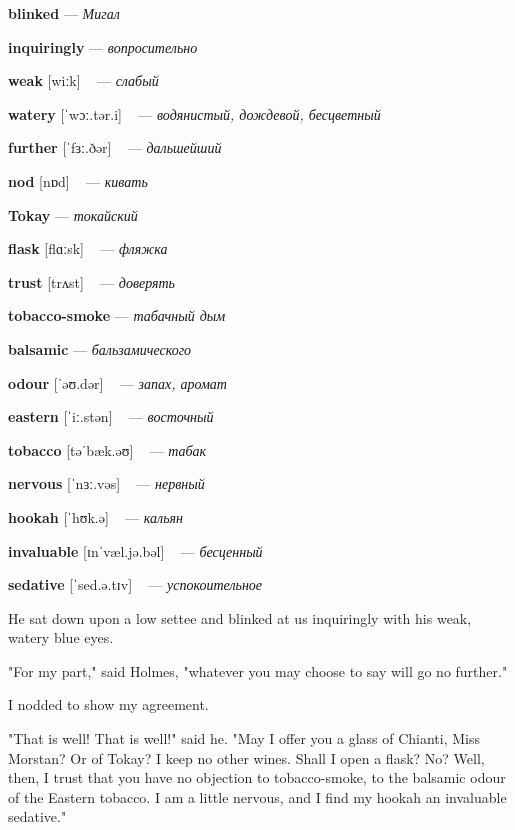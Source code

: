 \documentclass[a4paper,oneside,12pt]{amsart}
\begin{document}
{\large 

 {\bf blinked } --- \emph{ Мигал }

{\bf inquiringly } --- \emph{ вопросительно }

{\bf weak } [wiːk] ~ --- \emph{ слабый }

{\bf watery } [ˈwɔː.tər.i] ~ --- \emph{ водянистый, дождевой, бесцветный }

{\bf further } [ˈfɜː.ðər] ~ --- \emph{ дальшейший }

{\bf nod } [nɒd] ~ --- \emph{ кивать }

{\bf Tokay } --- \emph{ токайский }

{\bf flask } [flɑːsk] ~ --- \emph{ фляжка }

{\bf trust } [trʌst] ~ --- \emph{ доверять }

{\bf tobacco-smoke } --- \emph{ табачный дым }

{\bf balsamic } --- \emph{ бальзамического }

{\bf odour } [ˈəʊ.dər] ~ --- \emph{ запах, аромат }

{\bf eastern } [ˈiː.stən] ~ --- \emph{ восточный }

{\bf tobacco } [təˈbæk.əʊ] ~ --- \emph{ табак }

{\bf nervous } [ˈnɜː.vəs] ~ --- \emph{ нервный }

{\bf hookah } [ˈhʊk.ə] ~ --- \emph{ кальян }

{\bf invaluable } [ɪnˈvæl.jə.bəl] ~ --- \emph{ бесценный }

{\bf sedative } [ˈsed.ə.tɪv] ~ --- \emph{ успокоительное }

} \vspace{6mm} {\Large 

 
He sat down upon a low settee and blinked at us inquiringly with his weak, watery blue eyes.

"For my part," said Holmes, "whatever you may choose to say will go no further."

I nodded to show my agreement.

"That is well! That is well!" said he. "May I offer you a glass of Chianti, Miss Morstan? Or of Tokay? I keep no other wines. Shall I open a flask? No? Well, then, I trust that you have no objection to tobacco-smoke, to the balsamic odour of the Eastern tobacco. I am a little nervous, and I find my hookah an invaluable sedative."
\\ } 
\end{document}
